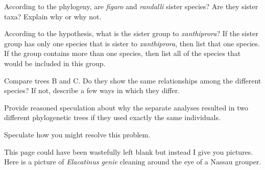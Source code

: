 \documentclass[11pt, addpoints]{exam}
\begin{document}
\begin{questions}

\question[2]
According to the phylogeny, are \emph{figaro} and \emph{randalli}
sister species? Are they sister taxa? Explain why or why not.


\newpage

\question[2]
According to the hypothesis, what is the sister group to
\emph{xanthiprora}? If the sister group has only one species that is
sister to \emph{xanthiprora}, then list that one species. If the group
contains more than one species, then list all of the species that would
be included in this group.



\question[2]
Compare trees B and C. Do they show the same relationships among the
different species? If not, describe a few ways in which they differ.


\question[2]
Provide reasoned speculation about why the separate analyses
resulted in two different phylogenetic trees if they used exactly the
same individuals.


\question[2]
Speculate how you might resolve this problem.


\end{questions}

\newpage

\noindent This page could have been wastefully left blank but instead I give you
 pictures. Here is a picture of \emph{Elacatinus genie} cleaning
around the eye of a Nassau grouper.
\end{document}

